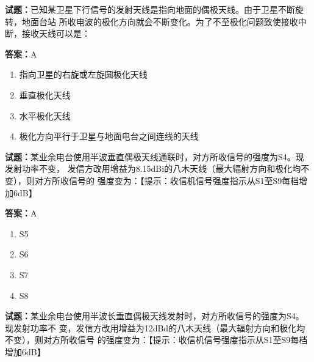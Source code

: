 \documentclass{ctexbook}
\begin{document}




\vspace{1em}

\textbf{试题：}已知某卫星下行信号的发射天线是指向地面的偶极天线。由于卫星不断旋转，地面台站
所收电波的极化方向就会不断变化。为了不至极化问题致使接收中断，接收天线可以是： 

\textbf{答案：}A 

\begin{enumerate}[leftmargin=3em]
  \item 指向卫星的右旋或左旋圆极化天线 

  \item 垂直极化天线 

  \item 水平极化天线 

  \item 极化方向平行于卫星与地面电台之间连线的天线 

\end{enumerate}






\vspace{1em}

\textbf{试题：}某业余电台使用半波垂直偶极天线通联时，对方所收信号的强度为S4。现发射功率不变，
发信方改用增益为8.15dBi的八木天线（最大辐射方向和极化均不变），则对方所收信号的
强度变为：【提示：收信机信号强度指示从S1至S9每档增加6dB】 

\textbf{答案：}A 

\begin{enumerate}[leftmargin=3em]
  \item S5 

  \item S6 

  \item S7 

  \item S8 

\end{enumerate}





\vspace{1em}

\textbf{试题：}某业余电台使用半波长垂直偶极天线发射时，对方所收信号的强度为S4。现发射功率不
变，发信方改用增益为12dBd的八木天线（最大辐射方向和极化均不变），则对方所收信号
的强度变为：【提示：收信机信号强度指示从S1至S9每档增加6dB】 
\end{document}
